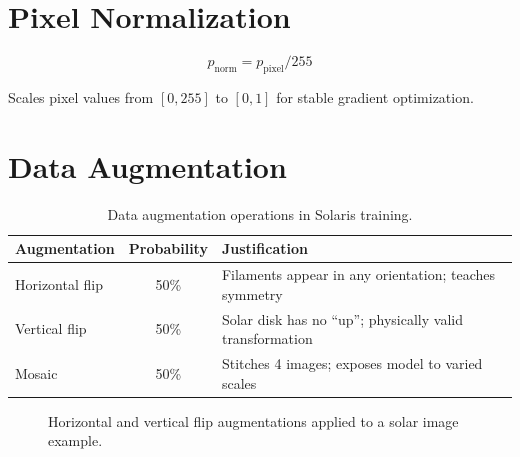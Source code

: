 \documentclass[12pt,a4paper,openany]{report}
\begin{document}
\section{Pixel Normalization}

\begin{equation}
  p_{\text{norm}} = p_{\text{pixel}} / 255
  \label{eq:pixnorm}
\end{equation}

Scales pixel values from $[0,255]$ to $[0,1]$ for stable gradient optimization.

\section{Data Augmentation}

\begin{table}[H]
\centering
\caption{Data augmentation operations in Solaris training.}
\renewcommand{\arraystretch}{1.3}
\begin{tabular}{l c p{7cm}}
\toprule
\textbf{Augmentation} & \textbf{Probability} & \textbf{Justification} \\
\midrule
Horizontal flip & 50\% & Filaments appear in any orientation; teaches symmetry \\
Vertical flip   & 50\% & Solar disk has no ``up''; physically valid transformation \\
Mosaic          & 50\% & Stitches 4 images; exposes model to varied scales \\
\bottomrule
\end{tabular}
\label{tab:aug}
\end{table}

\begin{figure}[H]
\centering
{}
\caption{Horizontal and vertical flip augmentations applied to a solar image example.}
\label{fig:augment}
\end{figure}
\end{document}
